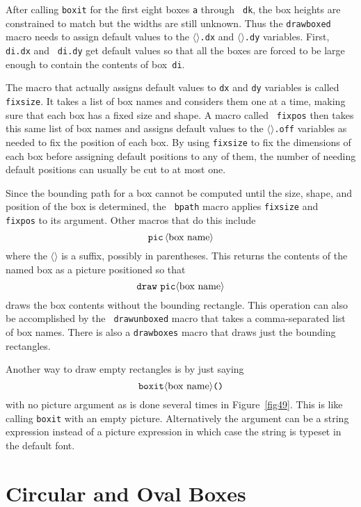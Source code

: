 \documentclass{article} %
\newcommand\descr[1]{{\langle\hbox{\rm#1}\rangle}}
\newcommand\invisgap{\nobreak\hskip0pt\relax}
\newcommand\tdescr[1]{$\langle$\invisgap{\rm#1}\invisgap$\rangle$}
\begin{document}
After calling {\tt boxit} for the first eight boxes {\tt a} through {\tt
dk}, the box heights are constrained to match but the widths are still
unknown.  Thus the {\tt drawboxed}
macro needs to assign default values to the \tdescr{box name}{\tt.dx}
and \tdescr{box name}{\tt.dy} variables.  First, {\tt di.dx} and {\tt
di.dy} get default values so that all the boxes are forced to be large
enough to contain the contents of box~{\tt di}.

The macro that actually assigns default values to {\tt dx} and {\tt dy}
variables is called {\tt
fixsize}\label{Dfixsiz}.  It takes a
list of box names and considers them one at a time, making sure that
each box has a fixed size and shape.  A macro called {\tt
fixpos}\label{Dfixpos} then takes this
same list of box names and assigns default values to the \tdescr{box
name}{\tt.off} variables as needed to fix the position of each box.  By
using {\tt fixsize} to fix the dimensions of each box before assigning
default positions to any of them, the number of needing default
positions can usually be cut to at most one.

Since the bounding path for a box cannot be computed until the size,
shape, and position of the box is determined, the {\tt
bpath} macro applies {\tt fixsize} and {\tt
fixpos} to its argument.  Other macros that do this
include\label{Dpic}
$$ {\tt pic}\, \descr{box name} $$
where the \tdescr{box name} is a suffix, possibly in parentheses.  This returns
the contents of the named box as a picture positioned so that
$$ {\tt draw\ pic} \descr{box name} $$
draws the box contents without the bounding rectangle.  This operation
can also be accomplished by the {\tt
drawunboxed}\label{Ddrunbx}
macro that takes a comma-separated list of box names.  There is also a
{\tt drawboxes}\label{Ddrbxes} macro
that draws just the bounding rectangles.

Another way to draw empty rectangles is by just saying\label{Deboxit}
$$ {\tt boxit} \descr{box name} \hbox{\tt ()} $$
with no picture argument as is done several times in Figure~\ref{fig49}.
This is like calling {\tt boxit} with an empty picture.
Alternatively the argument can be a string\label{Dsboxit} expression
instead of a picture
expression in which case the string is typeset in the default font.


\section{Circular and Oval Boxes}
\label{circbox}
\end{document}
